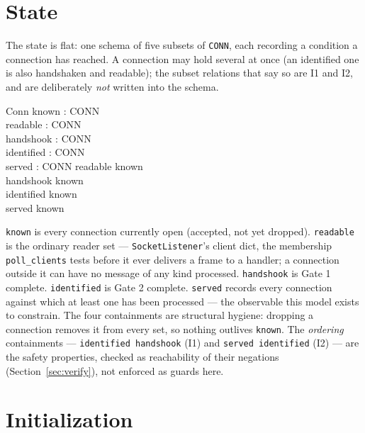 \documentclass[a4paper,10pt,fleqn]{article}
\begin{document}
\section{State}

The state is flat: one schema of five subsets of \texttt{CONN}, each
recording a condition a connection has reached.  A connection may hold
several at once (an identified one is also handshaken and readable); the
subset relations that say so are I1 and I2, and are deliberately
\emph{not} written into the schema.

\begin{schema}{Conn}
  known : \power CONN \\
  readable : \power CONN \\
  handshook : \power CONN \\
  identified : \power CONN \\
  served : \power CONN
\where
  readable \subseteq known \\
  handshook \subseteq known \\
  identified \subseteq known \\
  served \subseteq known
\end{schema}

\texttt{known} is every connection currently open (accepted, not yet
dropped).  \texttt{readable} is the ordinary reader set ---
\texttt{SocketListener}'s client dict, the membership \texttt{poll\_clients}
tests before it ever delivers a frame to a handler; a connection outside
it can have no message of any kind processed.  \texttt{handshook} is
Gate 1 complete.  \texttt{identified} is Gate 2 complete.  \texttt{served}
records every connection against which at least one  has
been processed --- the observable this model exists to constrain.  The
four containments are structural hygiene: dropping a connection removes it
from every set, so nothing outlives \texttt{known}.  The \emph{ordering}
containments --- \texttt{identified \subseteq handshook} (I1) and
\texttt{served \subseteq identified} (I2) --- are the safety properties,
checked as reachability of their negations (Section~\ref{sec:verify}), not
enforced as guards here.

\section{Initialization}
\end{document}
